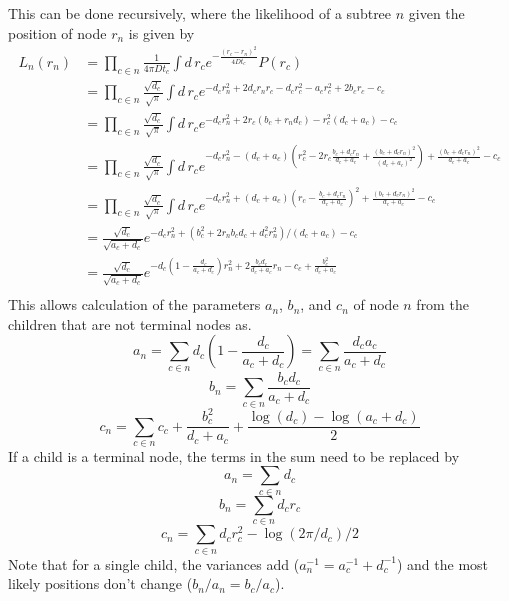 \documentclass[aps,rmp, onecolumn]{revtex4}
\begin{document}
This can be done recursively, where the likelihood of a subtree $n$ given the position of node $r_n$ is given by
\begin{equation}
    \begin{split}
        L_n(r_n) & = \prod_{c\in n}\frac{1}{4\pi D t_c}\int  d\, r_c e^{- \frac{(r_c - r_n)^2}{4Dt_c}}P(r_c) \\
        & = \prod_{c\in n} \frac{\sqrt{d_c}}{\sqrt{\pi}}\int d\, r_c e^{- d_c r_n^2 + 2d_c r_n r_c - d_c r_c^2 - a_c r_c^2 + 2 b_c r_c - c_c} \\
        & = \prod_{c\in n} \frac{\sqrt{d_c}}{\sqrt{\pi}}\int d\, r_c e^{- d_c r_n^2 + 2r_c(b_c + r_n d_c) - r_c^2 \left(d_c + a_c\right) - c_c} \\
        & = \prod_{c\in n} \frac{\sqrt{d_c}}{\sqrt{\pi}}\int d\, r_c e^{- d_c r_n^2 - (d_c + a_c)(r_c^2 - 2r_c\frac{b_c + d_c r_n}{d_c + a_c} + \frac{(b_c + d_c r_n)^2}{(d_c + a_c)^2}) + \frac{(b_c + d_c r_n)^2}{d_c + a_c} - c_c} \\
        & = \prod_{c\in n} \frac{\sqrt{d_c}}{\sqrt{\pi}}\int d\, r_c e^{- d_c r_n^2 + (d_c + a_c)(r_c - \frac{b_c + d_c r_n}{d_c + a_c})^2 + \frac{(b_c + d_c r_n)^2}{d_c + a_c} - c_c} \\
        & = \frac{\sqrt{d_c}}{\sqrt{a_c + d_c}} e^{- d_c r_n^2 + (b_c^2 + 2r_n b_c d_c + d_c^2 r_n^2 )/\left(d_c + a_c\right) - c_c} \\
        & = \frac{\sqrt{d_c}}{\sqrt{a_c + d_c}} e^{- d_c\left(1 - \frac{d_c}{a_c+d_c}\right) r_n^2 +  2\frac{b_c d_c}{d_c+a_c} r_n  - c_c + \frac{b_c^2}{d_c + a_c}} \\
    \end{split}
\end{equation}
This allows calculation of the parameters $a_n$, $b_n$, and $c_n$ of node $n$ from the children that are not terminal nodes as.
\begin{equation}
    a_n = \sum_{c\in n}d_c \left(1-\frac{d_c}{a_c+d_c}\right) = \sum_{c\in n} \frac{d_c a_c}{a_c+d_c}
\end{equation}
\begin{equation}
    b_n = \sum_{c\in n}\frac{b_c d_c}{a_c + d_c}
\end{equation}
\begin{equation}
    c_n = \sum_{c\in n} c_c  + \frac{b_c^2}{d_c + a_c} + \frac{\log(d_c) - \log(a_c+d_c)}{2}
\end{equation}
If a child is a terminal node, the terms in the sum need to be replaced by
\begin{equation}
    a_n = \sum_{c\in n} d_c
\end{equation}
\begin{equation}
    b_n = \sum_{c\in n} d_c r_c
\end{equation}
\begin{equation}
    c_n = \sum_{c\in n} d_c r_c^2 - \log(2\pi/d_c)/2
\end{equation}
Note that for a single child, the variances add ($a_n^{-1} = a_c^{-1} + d_c^{-1}$) and the most likely positions don't change ($b_n/a_n = b_c/a_c$).
\end{document}
